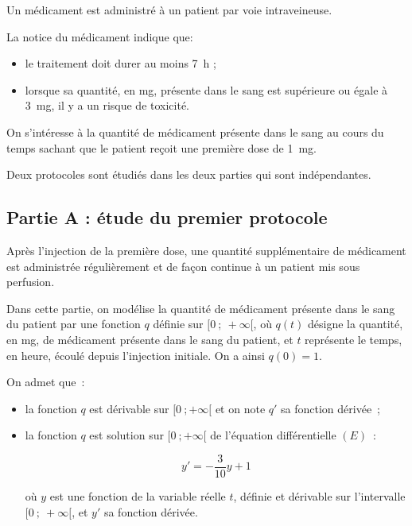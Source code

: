 Un médicament est administré à un patient par voie intraveineuse.

La notice du médicament indique que:

\begin{itemize}[noitemsep]
\item le traitement doit durer au moins 7~h ;
\item lorsque sa quantité, en mg, présente dans le sang est supérieure ou égale à 3~mg, il y a un risque de toxicité.
\end{itemize}

On s'intéresse à la quantité de médicament présente dans le sang au cours du temps sachant que le patient reçoit une première dose de 1~mg.

Deux protocoles sont étudiés dans les deux parties qui sont indépendantes.

\subsection*{Partie A : étude du premier protocole}

Après l'injection de la première dose, une quantité supplémentaire de médicament est administrée régulièrement et de façon continue à un patient mis sous perfusion.

Dans cette partie, on modélise la quantité de médicament présente dans le sang du patient par une fonction $q$ définie sur $[0~;~+\infty[$, où $q(t)$ désigne la quantité, en mg, de médicament présente dans le sang du patient, et $t$ représente le temps, en heure, écoulé depuis l'injection initiale. On a ainsi $q(0) = 1$.

On admet que~:
\begin{itemize}[noitemsep]
\item la fonction $q$ est dérivable sur $[0~;+\infty[$ et on note $q'$ sa fonction dérivée~;
\item la fonction $q$ est solution sur $[0~;+\infty[$ de l'équation différentielle $(E)$~:

\[y' = -\frac{3}{10}y + 1\]

où $y$ est une fonction de la variable réelle $t$, définie et dérivable sur l'intervalle $[0~;~+\infty[$, et $y'$ sa fonction dérivée.
\end{itemize}

\medskip


